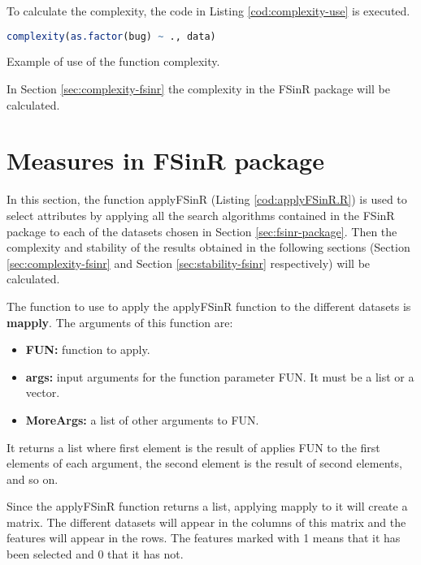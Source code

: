 To calculate the complexity, the code in Listing \ref{cod:complexity-use} is executed.

\begin{codefloat}[H]
\begin{lstlisting}[language=R, style=Ccolor]
complexity(as.factor(bug) ~ ., data)
\end{lstlisting}
\caption{Example of use of the function complexity.}
\label{cod:complexity-use}
\end{codefloat}

In Section \ref{sec:complexity-fsinr} the complexity in the FSinR package will be calculated.

\section{Measures in FSinR package}
\label{sec:measures-fsinr}

In this section, the function applyFSinR (Listing \ref{cod:applyFSinR.R}) is used to select attributes by applying all the search algorithms contained in the FSinR package to each of the datasets chosen in Section \ref{sec:fsinr-package}. Then the complexity and stability of the results obtained in the following sections (Section \ref{sec:complexity-fsinr} and Section \ref{sec:stability-fsinr} respectively) will be calculated.

The function to use to apply the applyFSinR function to the different datasets is \textbf{mapply}. The arguments of this function are:

\begin{itemize}
    \item \textbf{FUN:} function to apply.
    \item \textbf{args:} input arguments for the function parameter FUN. It must be a list or a vector.
    \item \textbf{MoreArgs:} a list of other arguments to FUN.
\end{itemize}

It returns a list where first element is the result of applies FUN to the first elements of each argument, the second element is the result of second elements, and so on.

Since the applyFSinR function returns a list, applying mapply to it will create a matrix. The different datasets will appear in the columns of this matrix and the features will appear in the rows. The features marked with 1 means that it has been selected and 0 that it has not.

